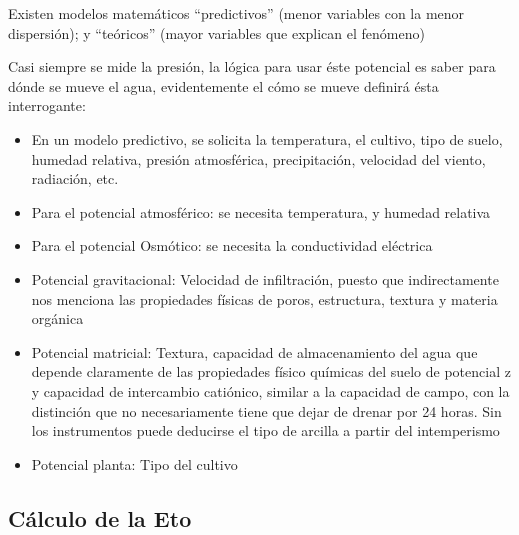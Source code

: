 Existen modelos matemáticos ``predictivos'' (menor variables con la menor dispersión); y ``teóricos'' (mayor variables que explican el fenómeno)

Casi siempre se mide la presión, la lógica para usar éste potencial es saber para dónde se mueve el agua, evidentemente el cómo se mueve definirá ésta interrogante:
\begin{itemize}
    \item En un modelo predictivo, se solicita la temperatura, el cultivo, tipo de suelo, humedad relativa, presión atmosférica, precipitación, velocidad del viento, radiación, etc.
    \item Para el potencial atmosférico: se necesita temperatura, y humedad relativa
    \item Para el potencial Osmótico: se necesita la conductividad eléctrica  
    \item Potencial gravitacional: Velocidad de infiltración, puesto que indirectamente nos menciona las propiedades físicas de poros, estructura, textura y materia orgánica
    \item Potencial  matricial: Textura, capacidad de almacenamiento del agua que depende claramente de las propiedades físico químicas del suelo de potencial z y capacidad de intercambio catiónico, similar a la capacidad de campo, con la distinción que no necesariamente tiene que dejar de drenar por 24 horas. Sin los instrumentos puede deducirse el tipo de arcilla a partir del intemperismo
    \item Potencial planta: Tipo del cultivo
\end{itemize}
\subsection{Cálculo de la Eto}
